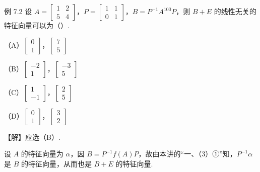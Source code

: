 \begin{fcard}{例 7.2}
设 $A=\begin{bmatrix}1&2\\5&4\end{bmatrix}$，$P=\begin{bmatrix}1&1\\0&1\end{bmatrix}$，$B=P^{-1}A^{100}P$，则 $B+E$ 的线性无关的特征向量可以为（\quad）.

（A）$\begin{bmatrix}0\\1\end{bmatrix}$，$\begin{bmatrix}7\\5\end{bmatrix}$

（B）$\begin{bmatrix}-2\\1\end{bmatrix}$，$\begin{bmatrix}-3\\5\end{bmatrix}$

（C）$\begin{bmatrix}1\\-1\end{bmatrix}$，$\begin{bmatrix}2\\5\end{bmatrix}$

（D）$\begin{bmatrix}0\\1\end{bmatrix}$，$\begin{bmatrix}3\\2\end{bmatrix}$

【解】应选（B）.

设 $A$ 的特征向量为 $\alpha$，因 $B=P^{-1}f(A)P$，故由本讲的“一、（3）①”知，$P^{-1}\alpha$ 是 $B$ 的特征向量，从而也是 $B+E$ 的特征向量.


\end{fcard}

